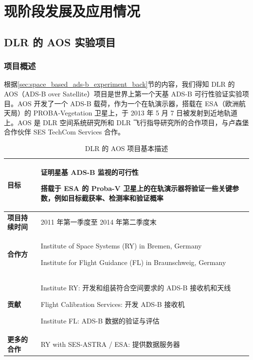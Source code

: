 
\chapter{现阶段发展及应用情况}

\section{DLR 的 AOS 实验项目}

\subsection{项目概述}

根据\ref{sec:space_based_ads-b_experiment_back}节的内容，我们得知 DLR 的 AOS（ADS-B over Satellite）项目是世界上第一个天基 ADS-B 可行性验证实验项目。AOS 开发了一个 ADS-B 载荷，作为一个在轨演示器，搭载在 ESA（欧洲航天局）的 PROBA-Vegetation 卫星上，于 2013 年 5 月 7 日被发射到近地轨道上。AOS 是 DLR 空间系统研究所和 DLR 飞行指导研究所的合作项目，与卢森堡合作伙伴 SES TechCom Services 合作。

\renewcommand\arraystretch{1.5}
\begin{table}[htbp]
\centering
\caption{DLR 的 AOS 项目基本描述}
\label{tab:}
\begin{tabular}[b]{|p{2.5cm}<{\raggedleft}|p{12cm}<{\raggedright}|}
\hline
\textbf{目标} & 证明星基 ADS-B 监视的可行性 \par
            搭载于 ESA 的 Proba-V 卫星上的在轨演示器将验证一些关键参数，例如目标截获率、检测率和验证概率 \\
\hline
\textbf{项目持续时间} & 2011 年第一季度至 2014 年第二季度末 \\
\hline
\textbf{合作方} & Institute of Space Systems (RY) in Bremen, Germany \par
        Institute for Flight Guidance (FL) in Braunschweig, Germany \\
\hline
\textbf{贡献} & Institute RY: 开发和组装符合空间要求的 ADS-B 接收机和天线\par
Flight Calibration Services: 开发 ADS-B 接收机\par
Institute FL: ADS-B 数据的验证与评估 \\
\hline
\textbf{更多的合作} & RY with SES-ASTRA / ESA: 提供数据服务器 \\
\hline
\end{tabular}
\end{table}

